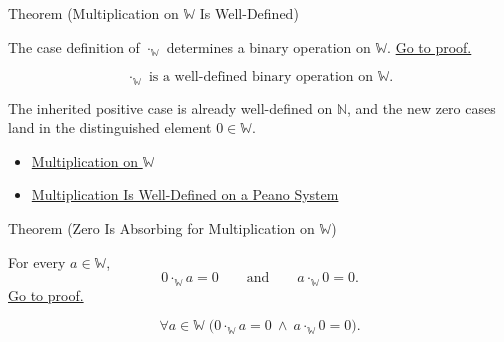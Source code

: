 \begin{theorembox}{Theorem (Multiplication on \texorpdfstring{$\mathbb{W}$}{W} Is Well-Defined)}
\begin{theorem}
\label{thm:multiplication-on-w-well-defined}
The case definition of $\cdot_{\mathbb{W}}$ determines a binary operation on
$\mathbb{W}$.
\hyperref[prf:multiplication-on-w-well-defined]{Go to proof.}
\end{theorem}
\end{theorembox}

\begin{remark*}
\[
\cdot_{\mathbb{W}}\text{ is a well-defined binary operation on }\mathbb{W}.
\]
\end{remark*}

\begin{remark*}[Interpretation]
The inherited positive case is already well-defined on $\mathbb{N}$, and the
new zero cases land in the distinguished element $0\in\mathbb{W}$.
\end{remark*}

\begin{dependencies}
\begin{itemize}
  \item \hyperref[def:multiplication-on-w]{Multiplication on $\mathbb{W}$}
  \item \hyperref[thm:multiplication-well-defined-on-peano-system]{Multiplication Is Well-Defined on a Peano System}
\end{itemize}
\end{dependencies}

\begin{theorembox}{Theorem (Zero Is Absorbing for Multiplication on \texorpdfstring{$\mathbb{W}$}{W})}
\begin{theorem}
\label{thm:zero-absorbing-for-multiplication-on-w}
For every $a\in\mathbb{W}$,
\[
0\cdot_{\mathbb{W}}a=0
\qquad\text{and}\qquad
a\cdot_{\mathbb{W}}0=0.
\]
\hyperref[prf:zero-absorbing-for-multiplication-on-w]{Go to proof.}
\end{theorem}
\end{theorembox}

\begin{remark*}
\[
\forall a\in\mathbb{W}\;
\bigl(0\cdot_{\mathbb{W}}a=0\ \wedge\ a\cdot_{\mathbb{W}}0=0\bigr).
\]
\end{remark*}


